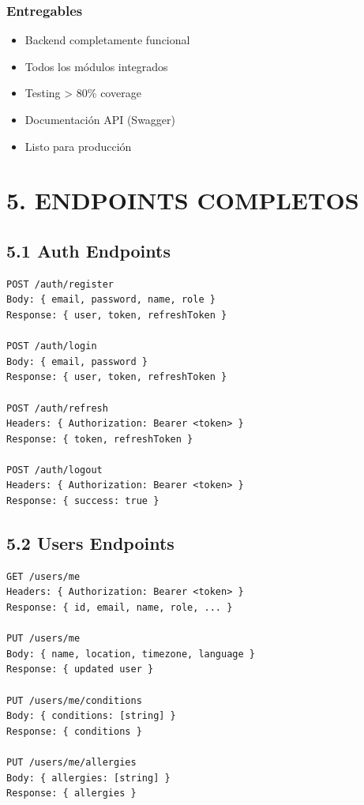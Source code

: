 \documentclass[12pt,a4paper]{article}
\begin{document}
\subsubsection{Entregables}
\begin{itemize}
    \item Backend completamente funcional
    \item Todos los módulos integrados
    \item Testing > 80\% coverage
    \item Documentación API (Swagger)
    \item Listo para producción
\end{itemize}

\section{5. ENDPOINTS COMPLETOS}

\subsection{5.1 Auth Endpoints}

\begin{verbatim}
POST /auth/register
Body: { email, password, name, role }
Response: { user, token, refreshToken }

POST /auth/login
Body: { email, password }
Response: { user, token, refreshToken }

POST /auth/refresh
Headers: { Authorization: Bearer <token> }
Response: { token, refreshToken }

POST /auth/logout
Headers: { Authorization: Bearer <token> }
Response: { success: true }
\end{verbatim}

\subsection{5.2 Users Endpoints}

\begin{verbatim}
GET /users/me
Headers: { Authorization: Bearer <token> }
Response: { id, email, name, role, ... }

PUT /users/me
Body: { name, location, timezone, language }
Response: { updated user }

PUT /users/me/conditions
Body: { conditions: [string] }
Response: { conditions }

PUT /users/me/allergies
Body: { allergies: [string] }
Response: { allergies }
\end{verbatim}
\end{document}
